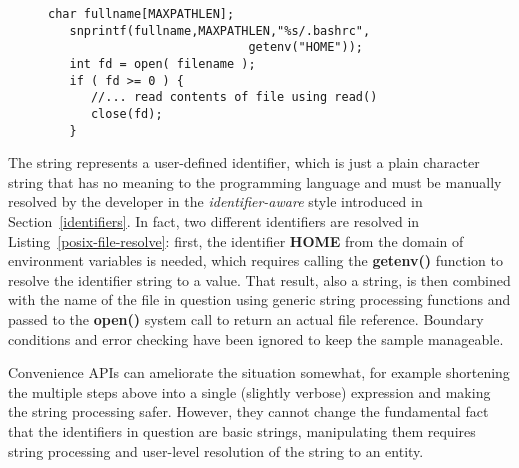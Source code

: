 \documentclass[preprint,authoryear]{acm_proc_article-sp}
\begin{document}
\begin{figure}[htbp]
\begin{lstlisting}[style=L,label=posix-file-resolve,caption=Resolving a name to a file in the user's home directory.]
   char fullname[MAXPATHLEN];
   snprintf(fullname,MAXPATHLEN,"%s/.bashrc",
                            getenv("HOME"));
   int fd = open( filename );
   if ( fd >= 0 ) { 
      //... read contents of file using read()
      close(fd);
   }
\end{lstlisting}
\end{figure}

The string represents a user-defined identifier, which is just a plain character
string that has no meaning to the programming language and must be 
manually resolved by the developer in the {\em identifier-aware} style 
introduced in Section~\ref{identifiers}.  In fact, two different identifiers
are resolved in Listing~\ref{posix-file-resolve}:  first, the identifier {\bf HOME}
from the domain of environment variables is needed, which requires calling
the {\bf getenv()} function to resolve the identifier string to a value.  That result,
also a string, is then combined with the name of the file in question using generic
string processing functions and passed
to the {\bf open()} system call to return an actual file reference.  Boundary conditions
and error checking have been ignored to keep the sample manageable.

Convenience APIs can ameliorate the situation somewhat, for example shortening 
the multiple steps above into a single (slightly verbose) expression and making the
string processing safer.  However, they cannot
change the fundamental fact that the identifiers in question are basic strings,
manipulating them requires string processing and user-level resolution of the
string to an entity.

%
\end{document}
